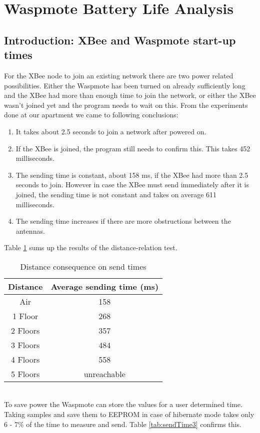 \pagebreak
\section{Waspmote Battery Life Analysis}
\label{AppendixD} %

\subsection{Introduction: XBee and Waspmote start-up times}
\label{startup}
For the XBee node to join an existing network there are two power related possibilities. Either the Waspmote has been turned on already sufficiently long and the XBee had more than enough time to join the network, or either the XBee wasn't joined yet and the program needs to wait on this. From the experiments done at our apartment we came to following conclusions:
\begin{enumerate}
\item It takes about 2.5 seconds to join a network after powered on.
\item If the XBee is joined, the program still needs to confirm this. This takes 452 milliseconds.
\item The sending time is constant, about 158 ms, if the XBee had more than 2.5 seconds to join. However in case the XBee must send immediately after it is joined, the sending time is not constant and takes on average 611 milliseconds.
\item The sending time increases if there are more obstructions between the antennas. 
\end{enumerate}
Table \ref{tab:sendTime} sums up the results of the distance-relation test.
\begin{table}[!ht]
\begin{center}
\begin{tabular}[!ht]{|c|c|}
\hline
\textbf{Distance} & \textbf{Average sending time (ms)}\\
\hline
Air & 158\\
\hline
1 Floor & 268\\
\hline
2 Floors & 357\\
\hline
3 Floors & 484\\
\hline
4 Floors & 558\\
\hline
5 Floors & unreachable\\
\hline
\end{tabular}
\caption{Distance consequence on send times}
\label{tab:sendTime}
\end{center}
\end{table}\\
To save power the Waspmote can store the values for a user determined time. Taking samples and save them to EEPROM in case of hibernate mode takes only 6 - 7\% of the time to measure and send. Table \ref{tab:sendTime3} confirms this.



